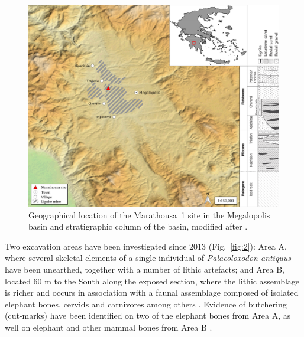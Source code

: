 \documentclass[preprint,authoryear,times]{elsarticle} %
\begin{document}
\begin{figure}[]
  \centering
  \includegraphics[width=1\textwidth]{../artwork/Fig1.png}
  \caption{Geographical location of the Marathousa~1 site in the Megalopolis basin and stratigraphic column of the basin, modified after \cite{Vugt2000}.}
  \label{fig:1}
\end{figure}

Two excavation areas have been investigated since 2013 (Fig.~\ref{fig:2}): Area A, where several skeletal elements of a single individual of \emph{Palaeoloxodon antiquus} have been unearthed, together with a number of lithic artefacts; and Area B, located 60 m to the South along the exposed section, where the lithic assemblage is richer and occurs in association with a faunal assemblage composed of isolated elephant bones, cervids and carnivores among others \citep{Konidaris,Tourloukis}. Evidence of butchering (cut-marks) have been identified on two of the elephant bones from Area A, as well on elephant and other mammal bones from Area B \citep{Konidaris}.
\end{document}
